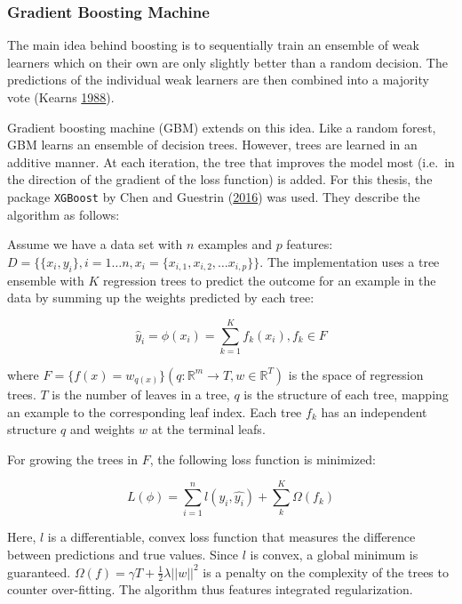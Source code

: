 \documentclass[
  11pt,
  a4paper,
  DIV=12,captions=tableheading,oneside,titlepage]{scrbook}
\begin{document}
\hypertarget{methods-gbm}{%
\subsubsection{Gradient Boosting Machine}\label{methods-gbm}}

The main idea behind boosting is to sequentially train an ensemble of weak learners which on their own are only slightly better than a random decision. The predictions of the individual weak learners are then combined into a majority vote (Kearns \protect\hyperlink{ref-kearns1988thoughts}{1988}).

Gradient boosting machine (GBM) extends on this idea. Like a random forest, GBM learns an ensemble of decision trees. However, trees are learned in an additive manner. At each iteration, the tree that improves the model most (i.e.~in the direction of the gradient of the loss function) is added. For this thesis, the package \texttt{XGBoost} by Chen and Guestrin (\protect\hyperlink{ref-chen2016xgboost}{2016}) was used. They describe the algorithm as follows:

Assume we have a data set with \(n\) examples and \(p\) features: \(D = \{\{x_i,y_i\}, i=1\ldots n, x_i=\{x_{i,1}, x_{i,2}, \ldots x_{i,p}\}\}\). The implementation uses a tree ensemble with \(K\) regression trees to predict the outcome for an example in the data by summing up the weights predicted by each tree:

\begin{equation}
\hat{y}_i = \phi(x_i) = \sum_{k=1}^K f_k(x_i), f_k \in F
\label{eq:gbm-ensemble}
\end{equation}

where \(F = \{f(x) = w_{q(x)}\} (q: \mathbb{R}^m \rightarrow T, w \in \mathbb{R}^T)\) is the space of regression trees. \(T\) is the number of leaves in a tree, \(q\) is the structure of each tree, mapping an example to the corresponding leaf index. Each tree \(f_k\) has an independent structure \(q\) and weights \(w\) at the terminal leafs.

For growing the trees in \(F\), the following loss function is minimized:

\begin{equation}
L(\phi) = \sum_{i=1}^n l(y_i, \hat{y_i}) + \sum_k^K \Omega(f_k)
\label{eq:gbm-loss}
\end{equation}

Here, \(l\) is a differentiable, convex loss function that measures the difference between predictions and true values. Since \(l\) is convex, a global minimum is guaranteed. \(\Omega(f) = \gamma T + \frac{1}{2}\lambda||w||^2\) is a penalty on the complexity of the trees to counter over-fitting. The algorithm thus features integrated regularization.
\end{document}
